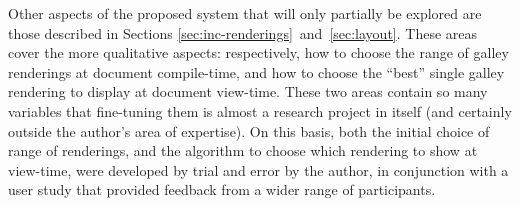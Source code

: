Other aspects of the proposed system that will only partially be explored are those described in Sections \ref{sec:inc-renderings}~and~\ref{sec:layout}. These areas cover the more qualitative aspects: respectively, how to choose the range of galley renderings at document compile-time, and how to choose the ``best'' single galley rendering to display at document view-time. These two areas contain so many variables that fine-tuning them is almost a research project in itself (and certainly outside the author's area of expertise). On this basis, both the initial choice of range of renderings, and the algorithm to choose which rendering to show at view-time, were developed by trial and error by the author, in conjunction with a user study that provided feedback from a wider range of participants.
